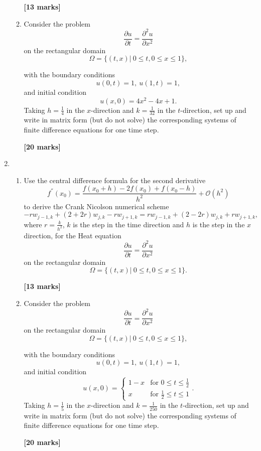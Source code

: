 \begin{enumerate}
\begin{enumerate}
\begin{flushright}
\textbf{[13 marks]}
\end{flushright}
	
	\item Consider the problem
	\[\frac{\partial u}{\partial t}=\frac{\partial^2 u}{\partial x^2} \]
	on the rectangular domain
		\[\Omega=\{(t,x)| \ 0\leq t, 0 \leq x \leq 1\}, \]

	with the boundary conditions
	\[ u(0,t)=1, \ u(1,t)=1,   \]
	and initial condition
	\[	u(x,0)=4x^2-4x+1.\]
		Taking $h=\frac{1}{4}$ in the $x$-direction and $k=\frac{1}{32}$ in the $t$-direction, set up and write in matrix form (but do not solve) the corresponding systems of finite difference equations for one time step.\\
\begin{flushright}
\textbf{[20 marks]}
\end{flushright}
\end{enumerate}

	\item 
\begin{enumerate}
	
	\item 
	Use the central difference formula for the second derivative 
	\[ f^{''}(x_0)=\frac{f(x_0+h)-2f(x_0)+f(x_0-h)}{h^2}+\mathcal{O}(h^2)\]
	to derive the Crank Nicolson numerical scheme
	\[-rw_{j-1,k}+(2+2r)w_{j,k}-rw_{j+1,k}=rw_{j-1,k}+(2-2r)w_{j,k}+rw_{j+1,k},\]
	where $r=\frac{k}{h^2}$, $k$ is the step in the time direction and $h$ is the step in the $x$ direction, 
	for the Heat equation 
	\[\frac{\partial u}{\partial t}=\frac{\partial^2 u}{\partial x^2} \]
	on the rectangular domain
	\[\Omega=\{(t,x)| \ 0\leq t, 0 \leq x \leq 1\}. \]

\begin{flushright}
\textbf{[13 marks]}
\end{flushright}
	
	\item Consider the problem
	\[\frac{\partial u}{\partial t}=\frac{\partial^2 u}{\partial x^2} \]
	on the rectangular domain
	\[\Omega=\{(t,x)| \ 0\leq t, 0 \leq x \leq 1\}, \]

	with the boundary conditions
	\[ u(0,t)=1, \ u(1,t)=1,   \]
	and initial condition
	\[	u(x,0)=\begin{cases}
	1-x & \text{for }0\leq t \leq \frac{1}{2}\\
	x & \text{for } \frac{1}{2}\leq t \leq 1
	\end{cases}. \]
		Taking $h=\frac{1}{5}$ in the $x$-direction and $k=\frac{1}{250}$ in the $t$-direction, set up and write in matrix form (but do not solve) the corresponding systems of finite difference equations for one time step.\\
\begin{flushright}
\textbf{[20 marks]}


\end{flushright}
\end{enumerate}
\end{enumerate}
